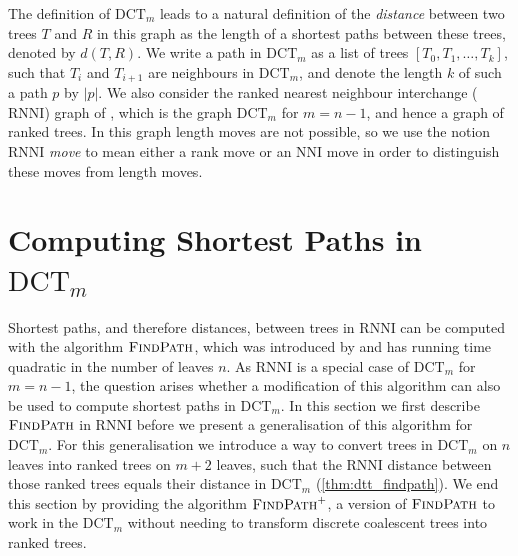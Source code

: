 \documentclass[11pt]{amsart}
\newcommand{\rnni}{\mathrm{RNNI}}
\newcommand{\findpath}{\textsc{FindPath}}
\newcommand{\nni}{\mathrm{NNI}}
\newcommand{\dct}{\mathrm{DCT}}
\newcommand{\summary}[1]{} %
\begin{document}
The definition of $\dct_m$ leads to a natural definition of the \emph{distance} between two trees $T$ and $R$ in this graph as the length of a shortest paths between these trees, denoted by $d(T,R)$.
We write a path in $\dct_m$ as a list of trees $[T_0, T_1, \ldots, T_k]$, such that $T_i$ and $T_{i+1}$ are neighbours in $\dct_m$, and denote the length $k$ of such a path $p$ by $|p|$.
We also consider the ranked nearest neighbour interchange ($\rnni$) graph of \textcite{Collienne2021}, which is the graph $\dct_m$ for $m=n-1$, and hence a graph of ranked trees.
In this graph length moves are not possible, so we use the notion $\rnni$ \emph{move} to mean either a rank move or an $\nni$ move in order to distinguish these moves from length moves.


\section{Computing Shortest Paths in $\dct_m$}
\label{section:fp_dtt}

\summary{Introduce how we can use $\findpath$ to compute $\dct_m$ distances}
Shortest paths, and therefore distances, between trees in $\rnni$ can be computed with the algorithm $\findpath$, which was introduced by \textcite{Collienne2021} and has running time quadratic in the number of leaves $n$.
As $\rnni$ is a special case of $\dct_m$ for $m = n-1$, the question arises whether a modification of this algorithm can also be used to compute shortest paths in $\dct_m$.
In this section we first describe $\findpath$ in $\rnni$ before we present a generalisation of this algorithm for $\dct_m$.
For this generalisation we introduce a way to convert trees in $\dct_m$ on $n$ leaves into ranked trees on $m+2$ leaves, such that the $\rnni$ distance between those ranked trees equals their distance in $\dct_m$ (\autoref{thm:dtt_findpath}).
We end this section by providing the algorithm $\findpath^+$, a version of $\findpath$ to work in the $\dct_m$ without needing to transform discrete coalescent trees into ranked trees.
\end{document}
